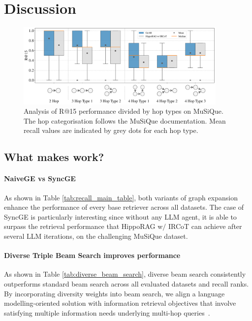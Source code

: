 \section{Discussion}


\begin{figure}[thbp]
  \centering
  \includegraphics[width=0.92\textwidth]{figures/experiments/hoptype_vs_recall.pdf}
  \caption{Analysis of R@15 performance divided by hop types on MuSiQue. The hop categorisation follows the MuSiQue documentation. Mean recall values are indicated by grey dots for each hop type.}
  \label{fig:recall_across_hoptype}
\end{figure}



\subsection{What makes \gear work?}
\label{subsec:what_makes_gear_work}

\paragraph{NaiveGE vs SyncGE}
As shown in Table \ref{tab:recall_main_table}, both variants of graph expansion enhance the performance of every base retriever across all datasets. The case of SyncGE is particularly interesting since without any LLM agent, it is able to surpass the retrieval performance that HippoRAG w$/$ IRCoT can achieve after several LLM iterations, on the challenging MuSiQue dataset.

\paragraph{Diverse Triple Beam Search improves performance}As shown in Table \ref{tab:diverse_beam_search}, diverse beam search consistently outperforms standard beam search across all evaluated datasets and recall ranks. By incorporating diversity weights into beam search, we align a language modelling-oriented solution with information retrieval objectives that involve satisfying multiple information needs underlying multi-hop queries~\cite{Drosou2010}.


